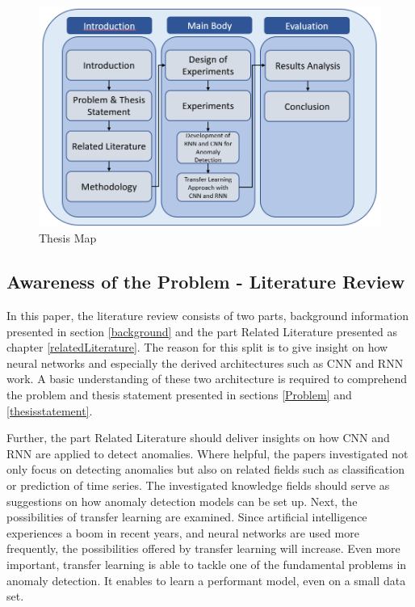 \begin{figure}[h]
	\centering
	\includegraphics[scale=0.5]{Figures/Thesis Map}
	\decoRule
	\caption[Thesis Map]{Thesis Map \parencite{own}}
	\label{Thesis Map}
\end{figure}

\newpage
\subsection{Awareness of the Problem - Literature Review}
In this paper, the literature review consists of two parts, background information presented in section \ref{background} and the part Related Literature presented as chapter \ref{relatedLiterature}. The reason for this split is to give insight on how neural networks and especially the derived architectures such as CNN and RNN work. A basic understanding of these two architecture is required to comprehend the problem and thesis statement presented in sections \ref{Problem} and \ref{thesisstatement}. 

Further, the part Related Literature should deliver insights on how CNN and RNN are applied to detect anomalies. Where helpful, the papers investigated not only focus on detecting anomalies but also on related fields such as classification or prediction of time series. The investigated knowledge fields should serve as suggestions on how anomaly detection models can be set up. Next, the possibilities of transfer learning are examined. Since artificial intelligence experiences a boom in recent years, and neural networks are used more frequently, the possibilities offered by transfer learning will increase. Even more important, transfer learning is able to tackle one of the fundamental problems in anomaly detection. It enables to learn a performant model, even on a small data set. 

